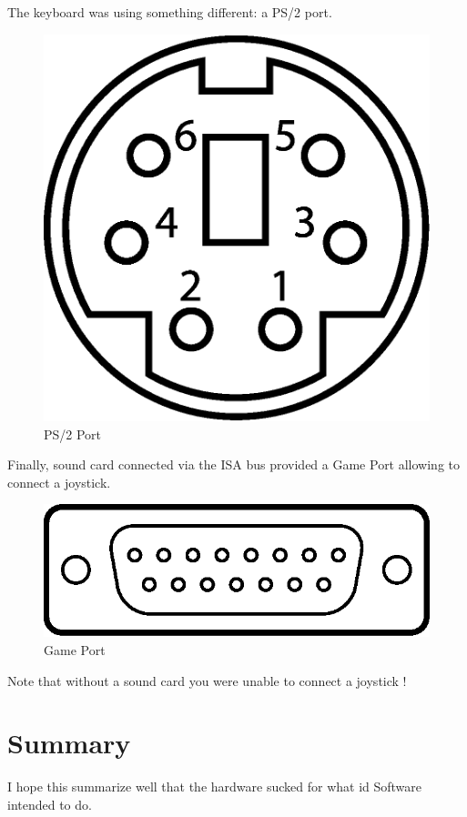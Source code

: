 \documentclass[book.tex]{subfiles}
\begin{document}
The keyboard was using something different: a PS/2 port.
 \begin{figure}[H]
\centering
\includegraphics[scale=0.2]{imgs/ports/MiniDIN-6_PS2.eps}
%
\caption{PS/2 Port}
\label{fig:ps2Port}
\end{figure}


Finally, sound card connected via the ISA bus provided a Game Port allowing to connect a joystick.
 \begin{figure}[H]
\centering
\includegraphics[scale=0.9]{imgs/ports/DA-15_GamePort.eps}
%
\caption{Game Port}
\label{fig:gamePort}
\end{figure}

Note that without a sound card you were unable to connect a joystick !



\section{Summary}
I hope this summarize well that the hardware sucked for what id Software intended to do. 
\end{document}
